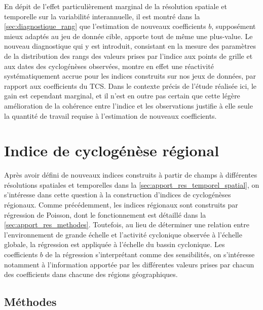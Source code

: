 \documentclass[../main.tex]{subfiles}
\begin{document}
En dépit de l'effet particulièrement marginal de la résolution spatiale et temporelle sur la variabilité interannuelle, il est montré dans la
\cref{sec:diagnostique_rang} que l'estimation de nouveaux coefficients $b$, supposément mieux adaptés au jeu de donnée cible, apporte tout de même une
plus-value. Le nouveau diagnostique qui y est introduit, consistant en la mesure des paramètres de la distribution des rangs des valeurs prises par l'indice aux
points de grille et aux dates des cyclogénèses observées, montre en effet une réactivité systématiquement accrue pour les indices construits sur nos jeux de
données, par rapport aux coefficients du TCS. Dans le contexte précis de l'étude réalisée ici, le gain est cependant marginal, et il n'est en outre pas certain
que cette légère amélioration de la cohérence entre l'indice et les observations justifie à elle seule la quantité de travail requise à l'estimation de nouveaux
coefficients.

\section{Indice de cyclogénèse régional}\label{sec:indice_regional}

Après avoir défini de nouveaux indices construits à partir de champs à différentes résolutions spatiales et temporelles dans la
\cref{sec:apport_res_temporel_spatial}, on s'intéresse dans cette question à la construction d'indices de cyclogénèses régionaux. Comme précédemment, les
indices régionaux sont construits par régression de Poisson, dont le fonctionnement est détaillé dans la \cref{sec:apport_res_methodes}. Toutefois, au lieu de
déterminer une relation entre l'environnement de grande échelle et l'activité cyclonique observée à l'échelle globale, la régression est appliquée à l'échelle
du bassin cyclonique. Les coefficients $b$ de la régression s'interprétant comme des sensibilités, on s'intéresse notamment à l'information apportée par les
différentes valeurs prises par chacun des coefficients dans chacune des régions géographiques.

\subsection{Méthodes}
\end{document}
